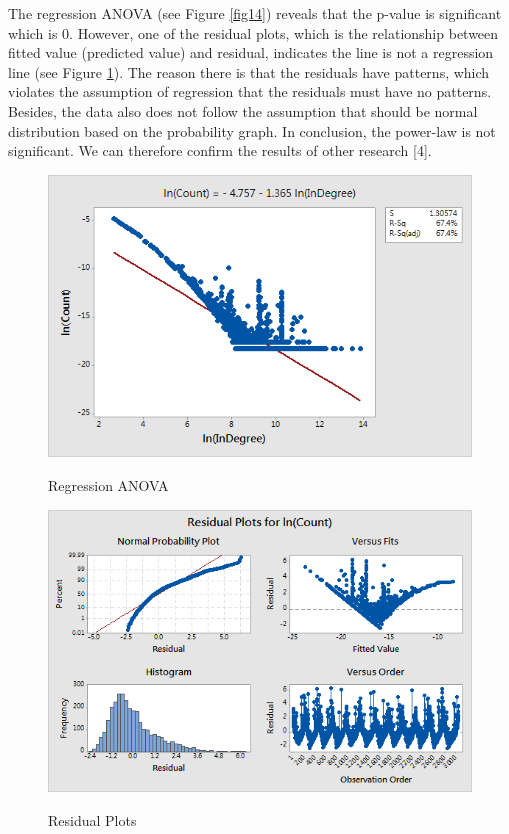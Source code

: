 The regression ANOVA (see Figure \ref{fig14}) reveals that the p-value is significant which is 0. However, one of the residual plots, which is the relationship between fitted value (predicted value) and residual, indicates the line is not a regression line (see Figure \ref{fig15}). The reason there is that the residuals have patterns, which violates the assumption of regression that the residuals must have no patterns. Besides, the data also does not follow the assumption that should be normal distribution based on the probability graph. In conclusion, the power-law is not significant. We can therefore confirm the results of other research [4].

\begin{figure}[H]
\begin{minipage}{.5\textwidth}
	\begin{center}
		\label{fig14}		
		\includegraphics[width=1.0\textwidth]{fig14}	
		\caption{Regression ANOVA}	
	\end{center}
\end{minipage} %
\begin{minipage}{.5\textwidth}
	\begin{center}
		\label{fig15}		
		\includegraphics[width=1.0\textwidth]{fig15}	
		\caption{Residual Plots}	
	\end{center}
\end{minipage}
\end{figure}

